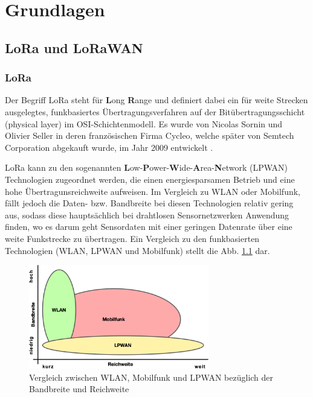 
\chapter{Grundlagen} \label{Grundlagen}
\section{LoRa und LoRaWAN} \label{LoRa und LoRaWAN}
\subsection{LoRa} \label{LoRa}

Der Begriff LoRa steht für \textbf{L}ong \textbf{R}ange und definiert dabei ein für weite Strecken ausgelegtes, funkbasiertes Übertragungsverfahren auf der Bitübertragungsschicht (physical layer) im OSI-Schichtenmodell. Es wurde von Nicolas Sornin und Olivier Seller in deren französischen Firma Cycleo, welche später von Semtech Corporation abgekauft wurde, im Jahr 2009 entwickelt \cite{semtech2020}. 

LoRa kann zu den sogenannten \textbf{L}ow-\textbf{P}ower-\textbf{W}ide-\textbf{A}rea-\textbf{N}etwork (LPWAN) Technologien zugeordnet werden, die einen energiesparsamen Betrieb und eine hohe Übertragunsreichweite aufweisen. Im Vergleich zu WLAN oder Mobilfunk, fällt jedoch die Daten- bzw. Bandbreite bei diesen Technologien relativ gering aus, sodass diese hauptsächlich bei drahtlosen Sensornetzwerken Anwendung finden, wo es darum geht Sensordaten mit einer geringen Datenrate über eine weite Funkstrecke zu übertragen. Ein Vergleich zu den funkbasierten Technologien (WLAN, LPWAN und Mobilfunk) stellt die Abb. \ref{fig:lpwan} dar.

\begin{figure}[h]
 \centering
 \includegraphics[width=0.7\textwidth]{pictures/lpwan-wlan-mobilfunk}
 \caption[Vergleich zwischen WLAN, Mobilfunk und LPWAN bezüglich der Bandbreite und Reichweite]{Vergleich zwischen WLAN, Mobilfunk und LPWAN bezüglich der Bandbreite und Reichweite \cite{lpwan2022}}
 \label{fig:lpwan}
\end{figure}

